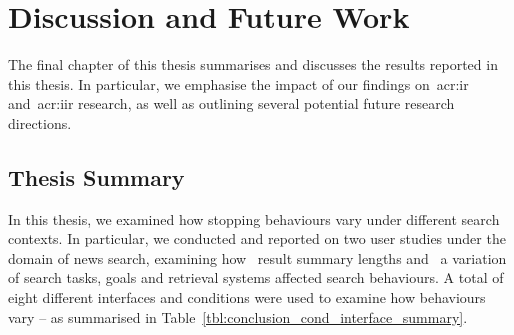 
\chapter[Discussion and Future Work]{Discussion and Future Work}\label{chap:conclusions}
The final chapter of this thesis summarises and discusses the results reported in this thesis. In particular, we emphasise the impact of our findings on~\gls{acr:ir} and~\gls{acr:iir} research, as well as outlining several potential future research directions.

\section{Thesis Summary}\label{sec:conclusions:summary}
In this thesis, we examined how stopping behaviours vary under different search contexts. In particular, we conducted and reported on two user studies under the domain of news search, examining how~ result summary lengths and~ a variation of search tasks, goals and retrieval systems affected search behaviours. A total of eight different interfaces and conditions were used to examine how behaviours vary -- as summarised in Table~\ref{tbl:conclusion_cond_interface_summary}.

